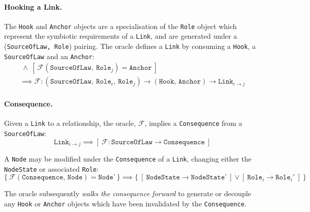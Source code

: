 \documentclass{article}
\numberwithin{equation}{section}
\begin{document}
\paragraph{Hooking a Link.} The \texttt{Hook} and \texttt{Anchor} objects are a specialisation of the \texttt{Role} object which represent the symbiotic requirements of a \texttt{Link}, and are generated under a (\texttt{SourceOfLaw, Role}) pairing. The oracle defines a \texttt{Link} by consuming a \texttt{Hook}, a \texttt{SourceOfLaw} and an \texttt{Anchor}:
\begin{multline}
	[ \ \mathcal{F}(\texttt{SourceOfLaw}, \ \texttt{Role}_i) = \texttt{Hook} \ ] \ \land \ [ \ \mathcal{F}(\texttt{SourceOfLaw}, \ \texttt{Role}_j) = \texttt{Anchor} \ ] \\
	\implies \mathcal{F}: (\texttt{SourceOfLaw}, \ \texttt{Role}_i, \ \texttt{Role}_j) \rightarrow (\texttt{Hook, Anchor}) \rightarrow \texttt{Link}_{i \rightarrow j}
\end{multline}

\paragraph{Consequence.} Given a \texttt{Link} to a relationship, the oracle, $\mathcal{F}$, implies a \texttt{Consequence} from a \texttt{SourceOfLaw}:
\begin{equation}
	\texttt{Link}_{i \rightarrow j} \implies [ \ \mathcal{F} : \texttt{SourceOfLaw} \rightarrow \texttt{Consequence} \ ]
\end{equation}

A \texttt{Node} may be modified under the \texttt{Consequence} of a \texttt{Link}, changing either the \texttt{NodeState} or associated \texttt{Role}: 
\begin{equation}
	\{ \ \mathcal{F}(\texttt{Consequence, Node}) = \texttt{Node'} \ \} \implies \{ \ [ \ \texttt{NodeState} \rightarrow \texttt{NodeState'} \ ] \lor [ \ \texttt{Role}_i \rightarrow \texttt{Role}_i' \ ] \ \}
\end{equation}

The oracle subsequently \textit{walks the consequence forward} to generate or decouple any \texttt{Hook} or \texttt{Anchor} objects which have been invalidated by the \texttt{Consequence}.
\end{document}
